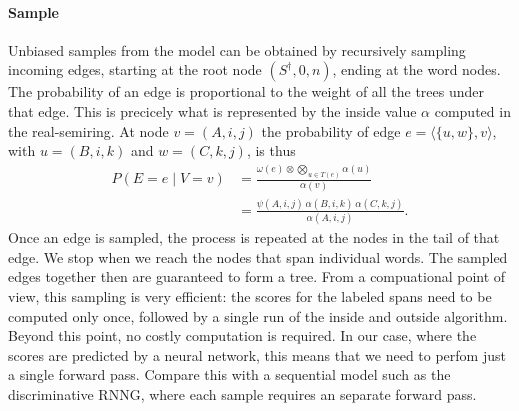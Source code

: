     \paragraph{Sample}
      Unbiased samples from the model can be obtained by recursively sampling incoming edges, starting at the root node $(S^{\dagger}, 0, n)$, ending at the word nodes. The probability of an edge is proportional to the weight of all the trees under that edge. This is precicely what is represented by the inside value $\alpha$ computed in the real-semiring. At node $v = (A, i, j)$ the probability of edge $e = \langle \{ u, w \}, v \rangle$, with $u = (B, i, k)$ and $w = (C, k, j)$, is thus
      \begin{align}
        \label{eq:sample}
        P(E = e \mid V = v)
          &= \frac{\omega(e) \otimes \bigotimes_{u \in T(e)} \alpha(u)}{\alpha(v)}  \nonumber  \\
          &= \frac{\psi(A, i, j) \, \alpha(B, i, k) \, \alpha(C, k, j)}{\alpha(A, i, j)}.
      \end{align}
      Once an edge is sampled, the process is repeated at the nodes in the tail of that edge. We stop when we reach the nodes that span individual words. The sampled edges together then are guaranteed to form a tree. From a compuational point of view, this sampling is very efficient: the scores for the labeled spans need to be computed only once, followed by a single run of the inside and outside algorithm. Beyond this point, no costly computation is required. In our case, where the scores are predicted by a neural network, this means that we need to perfom just a single forward pass. Compare this with a sequential model such as the discriminative RNNG, where each sample requires an separate forward pass.

